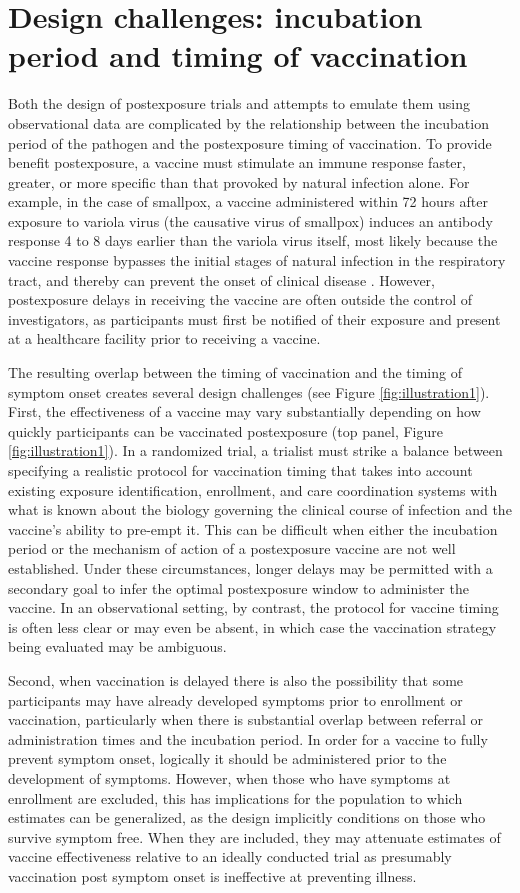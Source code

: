 \documentclass[11pt]{article}
\begin{document}
\section{Design challenges: incubation period and timing of vaccination}
Both the design of postexposure trials and attempts to emulate them using observational data are complicated by the relationship between the incubation period of the pathogen and the postexposure timing of vaccination. To provide benefit postexposure, a vaccine must stimulate an immune response faster, greater, or more specific than that provoked by natural infection alone. For example, in the case of smallpox, a vaccine administered within 72 hours after exposure to variola virus (the causative virus of smallpox) induces an antibody response 4 to 8 days earlier than the variola virus itself, most likely because the vaccine response bypasses the initial stages of natural infection in the respiratory tract, and thereby can prevent the onset of clinical disease \cite{massoudi_effectiveness_2003,keckler_effects_2013}. However, postexposure delays in receiving the vaccine are often outside the control of investigators, as participants must first be notified of their exposure and present at a healthcare facility prior to receiving a vaccine. 

The resulting overlap between the timing of vaccination and the timing of symptom onset creates several design challenges (see Figure \ref{fig:illustration1}). First, the effectiveness of a vaccine may vary substantially depending on how quickly participants can be vaccinated postexposure (top panel, Figure \ref{fig:illustration1}). In a randomized trial, a trialist must strike a balance between specifying a realistic protocol for vaccination timing that takes into account existing exposure identification, enrollment, and care coordination systems with what is known about the biology governing the clinical course of infection and the vaccine's ability to pre-empt it. This can be difficult when either the incubation period or the mechanism of action of a postexposure vaccine are not well established. Under these circumstances, longer delays may be permitted with a secondary goal to infer the optimal postexposure window to administer the vaccine. In an observational setting, by contrast, the protocol for vaccine timing is often less clear or may even be absent, in which case the vaccination strategy being evaluated may be ambiguous.

Second, when vaccination is delayed there is also the possibility that some participants may have already developed symptoms prior to enrollment or vaccination, particularly when there is substantial overlap between referral or administration times and the incubation period. In order for a vaccine to fully prevent symptom onset, logically it should be administered prior to the development of symptoms. However, when those who have symptoms at enrollment are excluded, this has implications for the population to which estimates can be generalized, as the design implicitly conditions on those who survive symptom free. When they are included, they may attenuate estimates of vaccine effectiveness relative to an ideally conducted trial as presumably vaccination post symptom onset is ineffective at preventing illness. 
\end{document}

